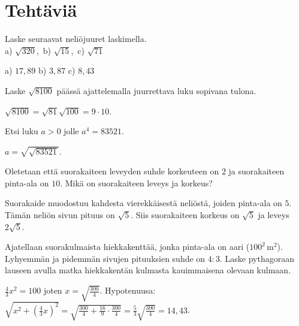 \section*{Tehtäviä}

\begin{tehtava}
Laske seuraavat neliöjuuret laskimella.\\
a) $\sqrt{320}$,\ b) $\sqrt{15}$,\ c) $\sqrt{71}$
\begin{vastaus}
a) $17{,}89$ b) $3{,}87$ c) $8{,}43$
\end{vastaus}
\end{tehtava}


\begin{tehtava}
Laske $\sqrt{8100}$ päässä ajattelemalla juurrettava luku sopivana tulona.
\begin{vastaus}
$\sqrt{8100}=\sqrt{81}\sqrt{100}=9\cdot 10$.
\end{vastaus}
\end{tehtava}


\begin{tehtava}
Etsi luku $a>0$ jolle $a^4=83521$.
\begin{vastaus}
$a=\sqrt{\sqrt{83521}}$.
\end{vastaus}
\end{tehtava}


\begin{tehtava}
Oletetaan että suorakaiteen leveyden suhde korkeuteen on $2$ ja suorakaiteen pinta-ala on $10$. Mikä on suorakaiteen 
leveys ja korkeus?
\begin{vastaus}
Suorakaide muodostuu kahdesta vierekkäisestä neliöstä, joiden pinta-ala on $5$. Tämän neliön sivun pituus on $\sqrt{5}$.
Siis suorakaiteen korkeus on $\sqrt{5}$ ja leveys $2\sqrt{5}$.
\end{vastaus}
\end{tehtava}


\begin{tehtava}
Ajatellaan suorakulmaista hiekkakenttää, jonka pinta-ala on aari ($100^2 \, \mathrm{m}^2$). Lyhyemmän ja pidemmän sivujen 
pituuksien suhde on $4:3$. Laske pythagoraan lauseen avulla matka hiekkakentän kulmasta kauimmaisena olevaan kulmaan.
\begin{vastaus}
$\frac{4}{3}x^2=100$ joten $x = \sqrt{\frac{300}{4}}$. 
Hypotenuusa: $\sqrt{x^2 + (\frac{4}{3}x)^2}=\sqrt{\frac{300}{4}+\frac{16}{9}\cdot \frac{300}{4}}
=\frac{5}{3}\sqrt{\frac{300}{4}}=14{,}43$.
\end{vastaus}
\end{tehtava}


